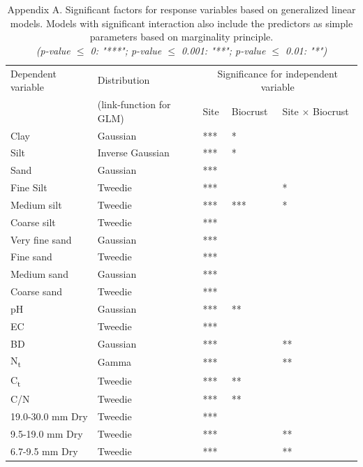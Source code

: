 \begin{table}[htbp] %
\centering %
\caption{Appendix A. Significant factors for response variables based on generalized linear models. Models with significant interaction also include the predictors as simple parameters based on marginality principle. \\ %
\textit{(p-value $\le$ 0: "***"; p-value $\le$ 0.001: "**"; p-value $\le$ 0.01: "*")}} %
\label{tab:appendix_a} %
\begin{tabular}{@{}lllll@{}} %
\toprule
Dependent variable & Distribution & \multicolumn{3}{c}{Significance for independent variable} \\
\cmidrule(lr){3-5} %
 & (link-function for GLM) & Site & Biocrust & Site $\times$ Biocrust \\ %
\midrule
Clay	& Gaussian	& ***	& *	& \\
Silt	& Inverse Gaussian	& ***	& *	& \\
Sand	& Gaussian	& ***	& 	& \\
Fine Silt	& Tweedie	& ***	& 	& * \\
Medium silt	& Tweedie	& ***	& ***	& * \\
Coarse silt	& Tweedie	& ***	& 	&  \\
Very fine sand	& Gaussian	& ***	& 	&  \\
Fine sand	& Tweedie	& ***	& 	&  \\
Medium sand	& Gaussian	& ***	& 	&  \\
Coarse sand	& Tweedie	& ***	& 	&  \\
pH	& Gaussian	& ***	& **	&  \\
EC	& Tweedie	& ***	& 	&  \\
BD	& Gaussian	& ***	& 	& ** \\
N\textsubscript{t}	& Gamma	& ***	& 	& ** \\ %
C\textsubscript{t}	& Tweedie	& ***	& **	&  \\ %
C/N	& Tweedie	& ***	& **	&  \\
19.0-30.0 mm Dry	& Tweedie	& ***	& 	&  \\
9.5-19.0 mm Dry	& Tweedie	& ***	& 	& ** \\
6.7-9.5 mm Dry	& Tweedie	& ***	& 	& ** \\

\end{tabular}
\end{table}
